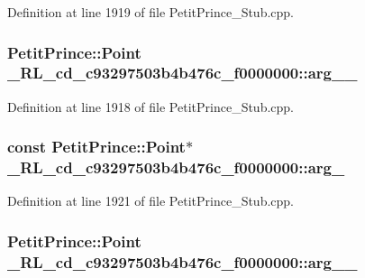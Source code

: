 Definition at line 1919 of file Petit\+Prince\+\_\+\+Stub.\+cpp.

\subsubsection[{\texorpdfstring{arg\+\_\+1\+\_\+}{arg_1_}}]{\setlength{\rightskip}{0pt plus 5cm}Petit\+Prince\+::\+Point \+\_\+R\+L\+\_\+cd\+\_\+c93297503b4b476c\+\_\+f0000000\+::arg\+\_\+\_\+}\hypertarget{class__0_r_l__cd__c93297503b4b476c__f0000000_aba17f6503cd4d839e8e4da44faa81214}{}\label{class__0_r_l__cd__c93297503b4b476c__f0000000_aba17f6503cd4d839e8e4da44faa81214}


Definition at line 1918 of file Petit\+Prince\+\_\+\+Stub.\+cpp.

\subsubsection[{\texorpdfstring{arg\+\_\+2}{arg_2}}]{\setlength{\rightskip}{0pt plus 5cm}const Petit\+Prince\+::\+Point$\ast$ \+\_\+R\+L\+\_\+cd\+\_\+c93297503b4b476c\+\_\+f0000000\+::arg\+\_}\hypertarget{class__0_r_l__cd__c93297503b4b476c__f0000000_aa1250982102c136edb168de08a43b793}{}\label{class__0_r_l__cd__c93297503b4b476c__f0000000_aa1250982102c136edb168de08a43b793}


Definition at line 1921 of file Petit\+Prince\+\_\+\+Stub.\+cpp.

\subsubsection[{\texorpdfstring{arg\+\_\+2\+\_\+}{arg_2_}}]{\setlength{\rightskip}{0pt plus 5cm}Petit\+Prince\+::\+Point \+\_\+R\+L\+\_\+cd\+\_\+c93297503b4b476c\+\_\+f0000000\+::arg\+\_\+\_\+}\hypertarget{class__0_r_l__cd__c93297503b4b476c__f0000000_ac6451cd86d3d5189dc4125fec3ba3906}{}\label{class__0_r_l__cd__c93297503b4b476c__f0000000_ac6451cd86d3d5189dc4125fec3ba3906}


